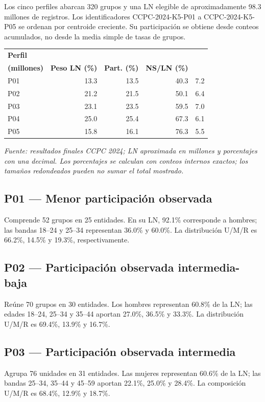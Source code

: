 \documentclass[11pt]{article}
\begin{document}
Los cinco perfiles abarcan 320 grupos y una LN elegible de aproximadamente 98.3 millones de registros. Los identificadores CCPC-2024-K5-P01 a CCPC-2024-K5-P05 se ordenan por centroide creciente. Su participación se obtiene desde conteos acumulados, no desde la media simple de tasas de grupos.

\begingroup
\centering
\begin{tabular}{@{}lrrrr@{}}
\hline
\textbf{Perfil} & \shortstack{\textbf{LN aprox.}\\\textbf{(millones)}} & \textbf{Peso LN (\%)} & \textbf{Part. (\%)} & \textbf{NS/LN (\%)} \\ \hline
P01 & 13.3 & 13.5 & 40.3 & 7.2 \\
P02 & 21.2 & 21.5 & 50.1 & 6.4 \\
P03 & 23.1 & 23.5 & 59.5 & 7.0 \\
P04 & 25.0 & 25.4 & 67.3 & 6.1 \\
P05 & 15.8 & 16.1 & 76.3 & 5.5 \\ \hline
\end{tabular}\par
\endgroup
\textit{Fuente: resultados finales CCPC 2024; LN aproximada en millones y porcentajes con una decimal. Los porcentajes se calculan con conteos internos exactos; los tamaños redondeados pueden no sumar el total mostrado.}

\subsection{P01 --- Menor participación observada}
Comprende 52 grupos en 25 entidades. En su LN, 92.1\% corresponde a hombres; las bandas 18--24 y 25--34 representan 36.0\% y 60.0\%. La distribución U/M/R es 66.2\%, 14.5\% y 19.3\%, respectivamente.

\subsection{P02 --- Participación observada intermedia-baja}
Reúne 70 grupos en 30 entidades. Los hombres representan 60.8\% de la LN; las edades 18--24, 25--34 y 35--44 aportan 27.0\%, 36.5\% y 33.3\%. La distribución U/M/R es 69.4\%, 13.9\% y 16.7\%.

\subsection{P03 --- Participación observada intermedia}
Agrupa 76 unidades en 31 entidades. Las mujeres representan 60.6\% de la LN; las bandas 25--34, 35--44 y 45--59 aportan 22.1\%, 25.0\% y 28.4\%. La composición U/M/R es 68.4\%, 12.9\% y 18.7\%.
\end{document}
